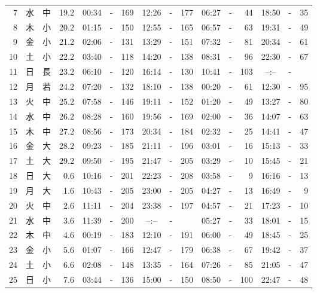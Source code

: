 \documentclass[12pt.a4j]{jsarticle}
\begin{document}
\begin{center}
\begin{table}[ht]
\begin{tabular}{|rc|cr|ccrccr|ccrccr|}
 7 & 水 & 中 & 19.2 &  00:34 &-& 169  &  12:26 &-& 177  &   06:27 &-&  44  &   18:50 &-&  35  \\
 8 & 木 & 小 & 20.2 &  01:15 &-& 150  &  12:55 &-& 165  &   06:57 &-&  63  &   19:31 &-&  49  \\
 9 & 金 & 小 & 21.2 &  02:06 &-& 131  &  13:29 &-& 151  &   07:32 &-&  81  &   20:34 &-&  61  \\
10 & 土 & 小 & 22.2 &  03:40 &-& 118  &  14:20 &-& 138  &   08:31 &-&  96  &   22:30 &-&  67  \\
11 & 日 & 長 & 23.2 &  06:10 &-& 120  &  16:14 &-& 130  &   10:41 &-& 103  &   --:-- &-&     \\
12 & 月 & 若 & 24.2 &  07:20 &-& 132  &  18:10 &-& 138  &   00:20 &-&  61  &   12:30 &-&  95  \\
13 & 火 & 中 & 25.2 &  07:58 &-& 146  &  19:11 &-& 152  &   01:20 &-&  49  &   13:27 &-&  80  \\
14 & 水 & 中 & 26.2 &  08:28 &-& 160  &  19:56 &-& 169  &   02:00 &-&  36  &   14:07 &-&  63  \\
15 & 木 & 中 & 27.2 &  08:56 &-& 173  &  20:34 &-& 184  &   02:32 &-&  25  &   14:41 &-&  47  \\
16 & 金 & 大 & 28.2 &  09:23 &-& 185  &  21:11 &-& 196  &   03:01 &-&  16  &   15:13 &-&  33  \\
17 & 土 & 大 & 29.2 &  09:50 &-& 195  &  21:47 &-& 205  &   03:29 &-&  10  &   15:45 &-&  21  \\
18 & 日 & 大 &  0.6 &  10:16 &-& 201  &  22:23 &-& 208  &   03:58 &-&   9  &   16:16 &-&  13  \\
19 & 月 & 大 &  1.6 &  10:43 &-& 205  &  23:00 &-& 205  &   04:27 &-&  13  &   16:49 &-&   9  \\
20 & 火 & 中 &  2.6 &  11:11 &-& 204  &  23:38 &-& 197  &   04:57 &-&  21  &   17:23 &-&  10  \\
21 & 水 & 中 &  3.6 &  11:39 &-& 200  &  --:-- &-&     &   05:27 &-&  33  &   18:01 &-&  15  \\
22 & 木 & 中 &  4.6 &  00:19 &-& 183  &  12:10 &-& 191  &   06:00 &-&  49  &   18:45 &-&  25  \\
23 & 金 & 小 &  5.6 &  01:07 &-& 166  &  12:47 &-& 179  &   06:38 &-&  67  &   19:42 &-&  37  \\
24 & 土 & 小 &  6.6 &  02:08 &-& 148  &  13:35 &-& 164  &   07:26 &-&  85  &   21:05 &-&  47  \\
25 & 日 & 小 &  7.6 &  03:44 &-& 136  &  15:00 &-& 150  &   08:50 &-& 100  &   22:47 &-&  48  \\

\end{tabular}
\end{table}
\end{center}
\end{document}
